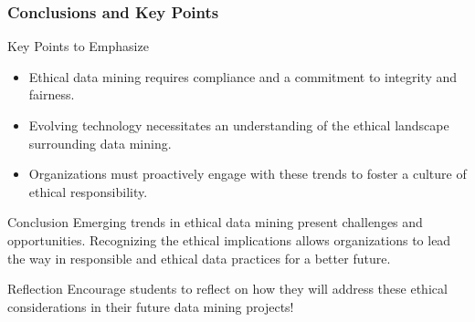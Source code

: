 \documentclass{beamer}
\begin{document}
\begin{frame}[fragile]
    \frametitle{Conclusions and Key Points}
    \begin{block}{Key Points to Emphasize}
        \begin{itemize}
            \item Ethical data mining requires compliance and a commitment to integrity and fairness.
            \item Evolving technology necessitates an understanding of the ethical landscape surrounding data mining.
            \item Organizations must proactively engage with these trends to foster a culture of ethical responsibility.
        \end{itemize}
    \end{block}

    \begin{block}{Conclusion}
        Emerging trends in ethical data mining present challenges and opportunities. Recognizing the ethical implications allows organizations to lead the way in responsible and ethical data practices for a better future.
    \end{block}
    
    \begin{block}{Reflection}
        Encourage students to reflect on how they will address these ethical considerations in their future data mining projects!
    \end{block}
\end{frame}
\end{document}
